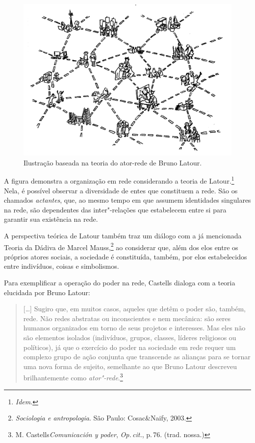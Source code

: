 \begin{figure}[!ht]
\includegraphics[width=\textwidth]{./imgs/grafico4.jpg}
\caption{\formular\footnotesize{Ilustração baseada na teoria do ator-rede de Bruno Latour.\protect\footnotemark}}
\end{figure}


A figura demonstra a organização em rede considerando a teoria de
Latour.\footnote{\textit{Idem}.} Nela, é possível observar a diversidade de entes que
constituem a rede. São os chamados \textit{actantes}, que, ao mesmo tempo em
que assumem identidades singulares na rede, são dependentes das
inter"-relações que estabelecem entre si para garantir sua existência na
rede.

A perspectiva teórica de Latour também traz um diálogo com a já
mencionada Teoria da Dádiva de Marcel Mauss,\footnote{\textit{Sociologia e antropologia}. São Paulo: Cosac\&Naify, 2003.} ao considerar que,
além dos elos entre os próprios atores sociais, a sociedade é
constituída, também, por elos estabelecidos entre indivíduos, coisas e
simbolismos.

Para exemplificar a operação do poder na rede, Castells dialoga
com a teoria elucidada por Bruno Latour:

\begin{quote}
{[}\ldots{}{]} Sugiro que, em muitos casos, aqueles que detêm o poder são,
também, rede. Não redes abstratas ou inconscientes e nem mecânica: são
seres humanos organizados em torno de seus projetos e interesses. Mas
eles não são elementos isolados (indivíduos, grupos, classes, líderes
religiosos ou políticos), já que o exercício do poder na sociedade em
rede requer um complexo grupo de ação conjunta que transcende as
alianças para se tornar uma nova forma de sujeito, semelhante ao que
Bruno Latour descreveu brilhantemente como \textit{ator"-rede}.\footnote{M. Castells\textit{Comunicación y poder}, \textit{Op.\,cit.}, p.\,76. (trad. nossa.)}
\end{quote}


